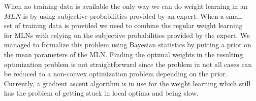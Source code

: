 \documentclass[12pt]{article}
\begin{document}
When no training data is available the only way we can do weight learning in
an $MLN$ is by using subjective probabilities provided by an expert. When a 
small set of training data is provided we need to combine the regular weight
learning for MLNs with relying on the subjective probabilities provided by the
expert. We managed to formalize this problem using Bayesian statistics by 
putting a prior on the mean parameters of the MLN.
Finding the optimal weights in the resulting optimization problem is not
straightforward since the problem in not all cases can be reduced to a 
non-convex optimization problem depending on the prior. Currently, 
a gradient ascent algorithm is in use for the weight learning which 
still has the problem of getting stuck in local optima and being slow. 



\end{document}
